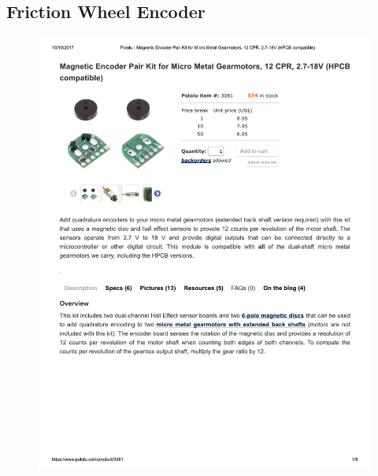 \documentclass[../main.tex]{subfiles}
\begin{document}
\subsection{Friction Wheel Encoder \cite{RotationalEncoder}} \label{RotationalEncoder}
\begin{figure}[H]
	\centering
	\includegraphics[width=\textwidth]{img/specs/Rotational-Encoder.pdf}
\end{figure}

\end{document}

